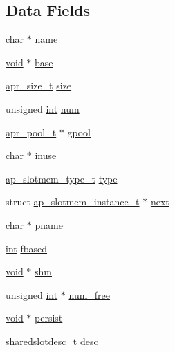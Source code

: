\subsection*{Data Fields}
\begin{DoxyCompactItemize}
\item 
char $\ast$ \hyperlink{structap__slotmem__instance__t_a38bb9d119b39c472445dd2be546b6177}{name}
\item 
\hyperlink{group__MOD__ISAPI_gacd6cdbf73df3d9eed42fa493d9b621a6}{void} $\ast$ \hyperlink{structap__slotmem__instance__t_a0aa2fb5aa60452bf03ce010ef1515de1}{base}
\item 
\hyperlink{group__apr__platform_gaaa72b2253f6f3032cefea5712a27540e}{apr\+\_\+size\+\_\+t} \hyperlink{structap__slotmem__instance__t_a89d3f68dd1387df2870c651ec32dbe79}{size}
\item 
unsigned \hyperlink{pcre_8txt_a42dfa4ff673c82d8efe7144098fbc198}{int} \hyperlink{structap__slotmem__instance__t_a2bfe6da469aeba5fb2915647480ccc14}{num}
\item 
\hyperlink{structapr__pool__t}{apr\+\_\+pool\+\_\+t} $\ast$ \hyperlink{structap__slotmem__instance__t_aa40ba52a58d13afafb2a8aea180a8f46}{gpool}
\item 
char $\ast$ \hyperlink{structap__slotmem__instance__t_a712babef8459c074fde0842e90d83abe}{inuse}
\item 
\hyperlink{group__MEM_ga2e647f79e68a1f0e6e733ec197c03bcc}{ap\+\_\+slotmem\+\_\+type\+\_\+t} \hyperlink{structap__slotmem__instance__t_afddd8c3f90f0aa40cf23d616d9f8acc3}{type}
\item 
struct \hyperlink{structap__slotmem__instance__t}{ap\+\_\+slotmem\+\_\+instance\+\_\+t} $\ast$ \hyperlink{structap__slotmem__instance__t_ad01ae3b5322dbf5377d3f966a6c7f827}{next}
\item 
char $\ast$ \hyperlink{structap__slotmem__instance__t_acb1b8cabcd80523064a2c54112df47c5}{pname}
\item 
\hyperlink{pcre_8txt_a42dfa4ff673c82d8efe7144098fbc198}{int} \hyperlink{structap__slotmem__instance__t_ac2e7c3fc1588e82815ca592decd90fca}{fbased}
\item 
\hyperlink{group__MOD__ISAPI_gacd6cdbf73df3d9eed42fa493d9b621a6}{void} $\ast$ \hyperlink{structap__slotmem__instance__t_a73761f318b27887e3d612aa933300a75}{shm}
\item 
unsigned \hyperlink{pcre_8txt_a42dfa4ff673c82d8efe7144098fbc198}{int} $\ast$ \hyperlink{structap__slotmem__instance__t_a7ee0d667a3f83840d1e3da1406fe14c5}{num\+\_\+free}
\item 
\hyperlink{group__MOD__ISAPI_gacd6cdbf73df3d9eed42fa493d9b621a6}{void} $\ast$ \hyperlink{structap__slotmem__instance__t_a747809e116b9a96c5114da785a4be047}{persist}
\item 
\hyperlink{structsharedslotdesc__t}{sharedslotdesc\+\_\+t} \hyperlink{structap__slotmem__instance__t_aee676e4dd7113b1567c9191eafc67cd3}{desc}
\end{DoxyCompactItemize}


